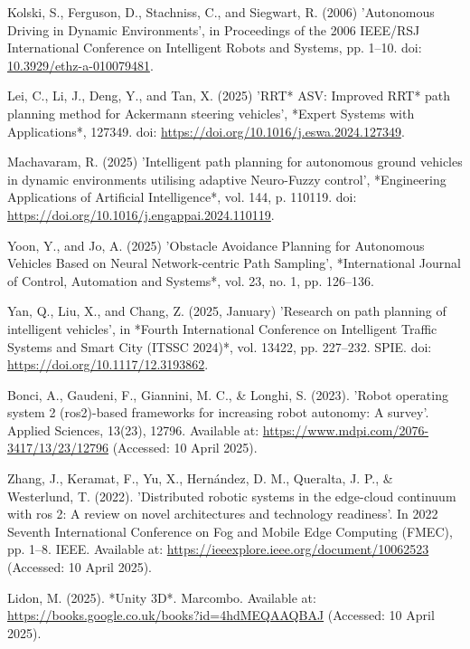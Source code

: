\documentclass[a4paper,11pt]{report}
\begin{document}
\begin{thebibliography}{28}
     Kolski, S., Ferguson, D., Stachniss, C., and Siegwart, R. (2006) 'Autonomous Driving in Dynamic Environments', in Proceedings of the 2006 IEEE/RSJ International Conference on Intelligent Robots and Systems, pp. 1–10. doi: \url{10.3929/ethz-a-010079481}.

     Lei, C., Li, J., Deng, Y., and Tan, X. (2025) 'RRT* ASV: Improved RRT* path planning method for Ackermann steering vehicles', *Expert Systems with Applications*, 127349. doi: \url{https://doi.org/10.1016/j.eswa.2024.127349}.

     Machavaram, R. (2025) 'Intelligent path planning for autonomous ground vehicles in dynamic environments utilising adaptive Neuro-Fuzzy control', *Engineering Applications of Artificial Intelligence*, vol. 144, p. 110119. doi: \url{https://doi.org/10.1016/j.engappai.2024.110119}.

     Yoon, Y., and Jo, A. (2025) 'Obstacle Avoidance Planning for Autonomous Vehicles Based on Neural Network-centric Path Sampling', *International Journal of Control, Automation and Systems*, vol. 23, no. 1, pp. 126–136.

     Yan, Q., Liu, X., and Chang, Z. (2025, January) 'Research on path planning of intelligent vehicles', in *Fourth International Conference on Intelligent Traffic Systems and Smart City (ITSSC 2024)*, vol. 13422, pp. 227–232. SPIE. doi: \url{https://doi.org/10.1117/12.3193862}.

     Bonci, A., Gaudeni, F., Giannini, M. C., \& Longhi, S. (2023). 'Robot operating system 2 (ros2)-based frameworks for increasing robot autonomy: A survey'. Applied Sciences, 13(23), 12796. Available at: \url{https://www.mdpi.com/2076-3417/13/23/12796} (Accessed: 10 April 2025).

     Zhang, J., Keramat, F., Yu, X., Hernández, D. M., Queralta, J. P., \& Westerlund, T. (2022). 'Distributed robotic systems in the edge-cloud continuum with ros 2: A review on novel architectures and technology readiness'. In 2022 Seventh International Conference on Fog and Mobile Edge Computing (FMEC), pp. 1–8. IEEE. Available at: \url{https://ieeexplore.ieee.org/document/10062523} (Accessed: 10 April 2025).

     Lidon, M. (2025). *Unity 3D*. Marcombo. Available at: \url{https://books.google.co.uk/books?id=4hdMEQAAQBAJ} (Accessed: 10 April 2025).


\end{thebibliography}
\end{document}
